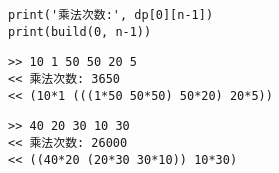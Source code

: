 \documentclass[../main]{subfiles}
\begin{document}
\begin{sloppy}
\begin{lstlisting}[style = Python]
print('乘法次数:', dp[0][n-1])
print(build(0, n-1))
\end{lstlisting}
\begin{center}
\begin{minipage}[t]{0.48\textwidth}
\begin{center}
    \begin{verbatim}
>> 10 1 50 50 20 5
<< 乘法次数: 3650
<< (10*1 (((1*50 50*50) 50*20) 20*5))
    \end{verbatim}
\end{center}
\end{minipage}
\begin{minipage}[t]{0.48\textwidth}
\begin{center}
    \begin{verbatim}
>> 40 20 30 10 30
<< 乘法次数: 26000
<< ((40*20 (20*30 30*10)) 10*30)
    \end{verbatim}
\end{center}
\end{minipage}
\end{center}









\end{sloppy}
\end{document}
